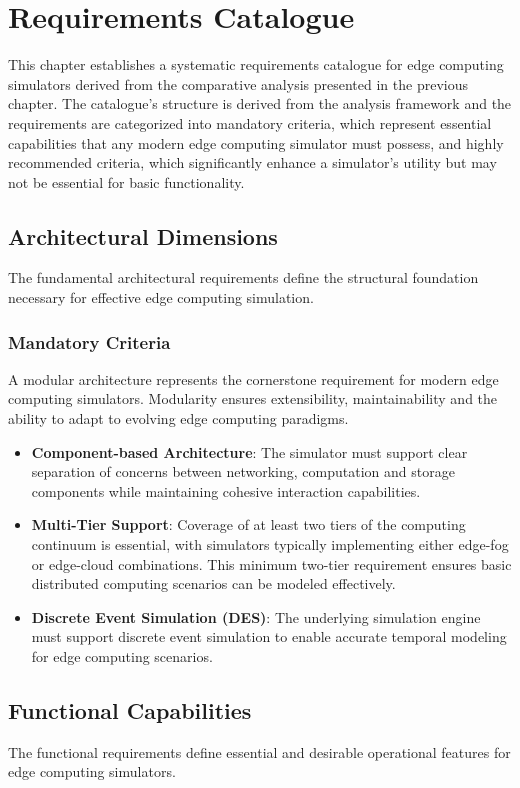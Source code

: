 \chapter{Requirements Catalogue}
This chapter establishes a systematic requirements catalogue for edge computing simulators derived from the comparative analysis presented in the previous chapter.
The catalogue's structure is derived from the analysis framework and the requirements are categorized into mandatory criteria, which represent essential capabilities that any modern edge computing simulator must possess, and highly recommended criteria, which significantly enhance a simulator's utility but may not be essential for basic functionality.

\section{Architectural Dimensions}
The fundamental architectural requirements define the structural foundation necessary for effective edge computing simulation.
\subsection{Mandatory Criteria}
A modular architecture represents the cornerstone requirement for modern edge computing simulators.
Modularity ensures extensibility, maintainability and the ability to adapt to evolving edge computing paradigms.
\begin{itemize}
  \item \textbf{Component-based Architecture}:
        The simulator must support clear separation of concerns between networking, computation and storage components while maintaining cohesive interaction capabilities.
  \item \textbf{Multi-Tier Support}:
        Coverage of at least two tiers of the computing continuum is essential, with simulators typically implementing either edge-fog or edge-cloud combinations.
        This minimum two-tier requirement ensures basic distributed computing scenarios can be modeled effectively.
  \item \textbf{Discrete Event Simulation (DES)}:
        The underlying simulation engine must support discrete event simulation to enable accurate temporal modeling for edge computing scenarios.
\end{itemize}

\section{Functional Capabilities}
The functional requirements define essential and desirable operational features for edge computing simulators.

